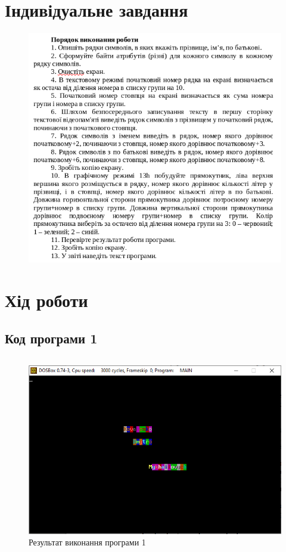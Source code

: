 \documentclass{article}
\begin{document}
\begin{normalsize}
		\section*{Індивідуальне завдання}
		\begin{figure}[H]
			\centering
			\includegraphics[scale=0.7]{v}
		\end{figure}
		
		\section*{Хід роботи}
		\subsection*{Код програми 1}
		\begin{lstlisting}[language={[x86masm]Assembler}]

		\end{lstlisting}
		
		\begin{figure}[H]
			\centering
			\includegraphics[scale=0.7]{1}
			\caption{Результат виконання програми 1}
		\end{figure}
		

\end{normalsize}
\end{document}
